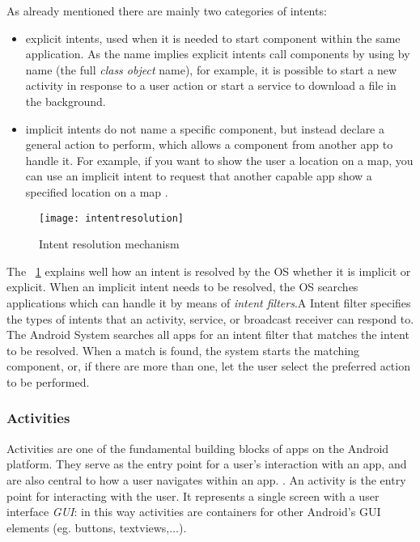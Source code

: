 As already mentioned there are mainly two categories of intents:
\begin{itemize}
	\item explicit intents, used when it is needed to start component within the same application. As the name implies explicit intents call components by using by name (the full \textit{class object} name), for example, it is possible to start a new activity in response to a user action or start a service to download a file in the background.
	\item implicit intents do not name a specific component, but instead declare a general action to perform, which allows a component from another app to handle it. For example, if you want to show the user a location on a map, you can use an implicit intent to request that another capable app show a specified location on a map \cite{devandroidintent}.
\end{itemize}

\begin{figure}[h]
	\centering
	\texttt{[image: intentresolution]}
	\caption{Intent resolution mechanism}
	\label{fig:2.4}
\end{figure}

The \figurename~\ref{fig:2.4} explains well how an intent is resolved by the OS whether it is implicit or explicit. When an implicit intent needs to be resolved, the OS searches applications which can handle it by means of \textit{intent filters}.A Intent filter specifies the types of intents that an activity, service, or broadcast receiver can respond to. The Android System searches all apps for an intent filter that matches the intent to be resolved. When a match is found, the system starts the matching component, or, if there are more than one, let the user select the preferred action to be performed.

\subsubsection{Activities} Activities are one of the fundamental building blocks of apps on the Android platform. They serve as the entry point for a user's interaction with an app, and are also central to how a user navigates within an app. \cite{devandroidactivity}. An activity is the entry point for interacting with the user. It represents a single screen with a user interface \textit{GUI}: in this way activities are containers for other Android's GUI elements (eg. buttons, textviews,...).

